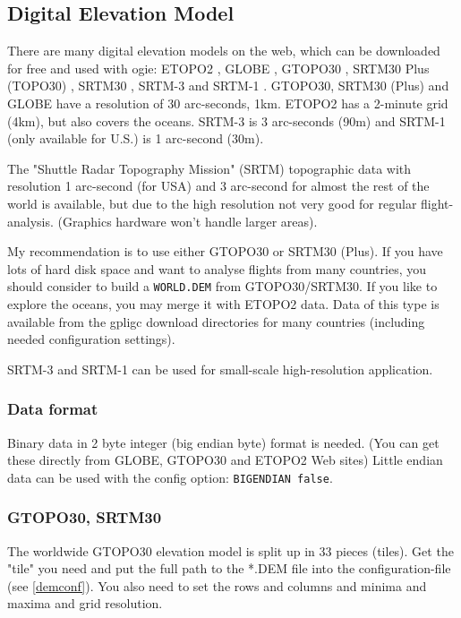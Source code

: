 

\subsection{Digital Elevation Model}
\label{dem}

There are many digital elevation models on the web, which can be downloaded for free and used with ogie:
ETOPO2 \cite{etopo2}, GLOBE \cite{globe}, GTOPO30 \cite{gtopo30}, SRTM30 Plus (TOPO30) \cite{srtm30plus}, SRTM30 \cite{srtmv2}, SRTM-3 \cite{srtmv2} and SRTM-1 \cite{srtmv2}.
GTOPO30, SRTM30 (Plus) and GLOBE have a resolution of 30 arc-seconds, 1km.
ETOPO2 has a 2-minute grid (4km), but also covers the oceans.
SRTM-3 is 3 arc-seconds (90m) and SRTM-1 (only available for U.S.) is 1 arc-second (30m).

The "Shuttle Radar Topography Mission" (SRTM) topographic data
with resolution 1 arc-second (for USA) and 3 arc-second for almost the rest of the world
is available, but due to the high resolution not very good for regular flight-analysis. (Graphics
hardware won't handle larger areas).

My recommendation is to use either GTOPO30 or SRTM30 (Plus).
If you have lots of hard disk space and want to analyse flights from many countries, you should consider
to build a \texttt{WORLD.DEM} from GTOPO30/SRTM30. If you like to explore the oceans, you may merge
it with ETOPO2 data. Data of this type is available from the gpligc download directories for many countries (including needed configuration settings).

SRTM-3 and SRTM-1 can be used for small-scale high-resolution application.


\subsubsection*{Data format}

Binary data in 2 byte integer (big endian byte) format is needed.
(You can get these directly from GLOBE, GTOPO30 and ETOPO2 Web sites)
Little endian data can be used with the config option: \texttt{BIGENDIAN false}.


\subsubsection{GTOPO30, SRTM30}
The worldwide GTOPO30 \cite{gtopo30} elevation model is split up in 33 pieces (tiles).
Get the "tile" you need and put the full path to the *.DEM file into the
configuration-file (see \ref{demconf}). You also need to set the rows and columns
and minima and maxima and grid resolution.

